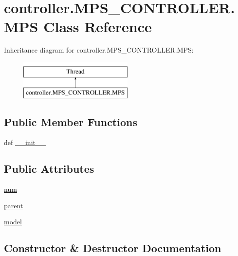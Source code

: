 \hypertarget{classcontroller_1_1MPS__CONTROLLER_1_1MPS}{}\section{controller.\+M\+P\+S\+\_\+\+C\+O\+N\+T\+R\+O\+L\+L\+E\+R.\+M\+P\+S Class Reference}
\label{classcontroller_1_1MPS__CONTROLLER_1_1MPS}
Inheritance diagram for controller.\+M\+P\+S\+\_\+\+C\+O\+N\+T\+R\+O\+L\+L\+E\+R.\+M\+P\+S\+:\begin{figure}[H]
\begin{center}
\leavevmode
\includegraphics[height=2.000000cm]{classcontroller_1_1MPS__CONTROLLER_1_1MPS}
\end{center}
\end{figure}
\subsection*{Public Member Functions}
\begin{DoxyCompactItemize}
\item 
def \hyperlink{classcontroller_1_1MPS__CONTROLLER_1_1MPS_a1d1173e338a822b9fb79f2729a5b22d6}{\+\_\+\+\_\+init\+\_\+\+\_\+}
\end{DoxyCompactItemize}
\subsection*{Public Attributes}
\begin{DoxyCompactItemize}
\item 
\hyperlink{classcontroller_1_1MPS__CONTROLLER_1_1MPS_a9de44ffe2a85ef6e94382e4cd83edbf4}{num}
\item 
\hyperlink{classcontroller_1_1MPS__CONTROLLER_1_1MPS_a1f68071cc37bb25d2118c03d7c6053de}{parent}
\item 
\hyperlink{classcontroller_1_1MPS__CONTROLLER_1_1MPS_ac4d5522cfd6410de5479c5adaa69445d}{model}
\end{DoxyCompactItemize}


\subsection{Constructor \& Destructor Documentation}
\hypertarget{classcontroller_1_1MPS__CONTROLLER_1_1MPS_a1d1173e338a822b9fb79f2729a5b22d6}{}
